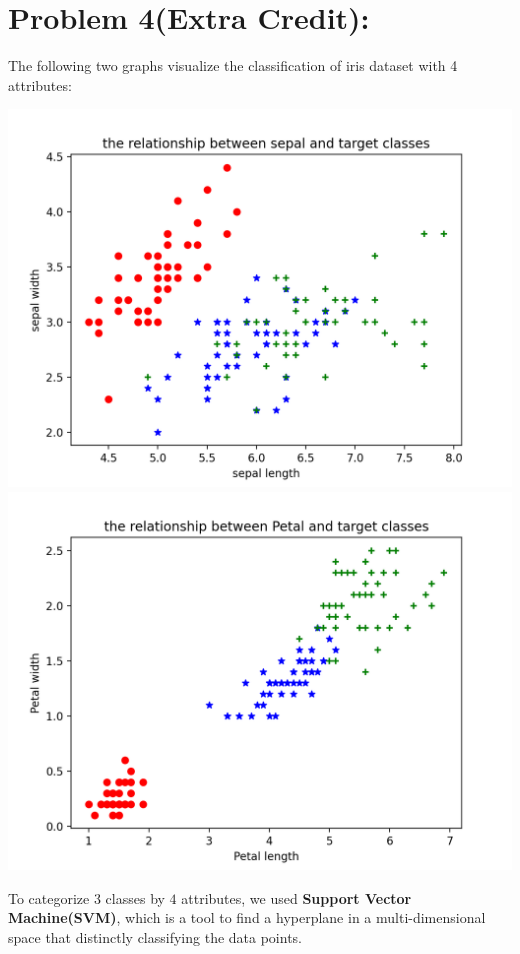 \documentclass[12pt]{article}
\begin{document}
\section*{Problem 4(Extra Credit): }
The following two graphs visualize the classification of iris dataset with 4 attributes: 
\begin{center}
    \includegraphics[scale=0.35]{fig/ec1.png}
    \includegraphics[scale=0.35]{fig/ec2.png}  
\end{center}
To categorize 3 classes by $4$ attributes, we used \textbf{Support Vector Machine(SVM)}, which is a tool to find a hyperplane in a multi-dimensional space that distinctly classifying the data points. 
\end{document}
